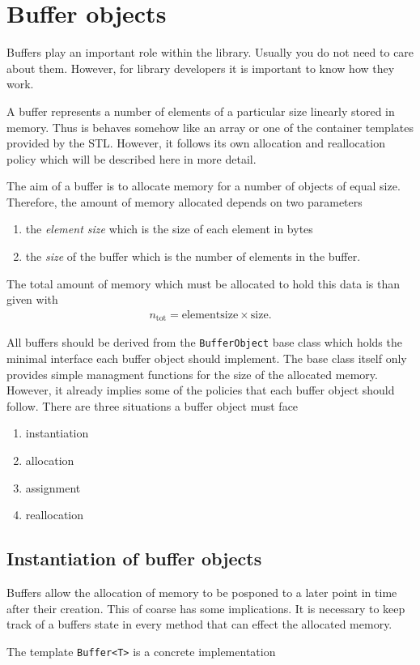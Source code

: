 \section{Buffer objects}
Buffers play an important role within the library. Usually you do not need 
to care about them. However, for library developers it is important 
to know how they work.

A buffer represents a number of elements of a particular size linearly 
stored in memory. Thus is behaves somehow like an array or one of the 
container templates provided by the STL. However, it follows its own 
allocation and reallocation policy which will be described here in more detail.  

The aim of a buffer is to allocate memory for a number of objects of equal 
size. Therefore, the amount of memory allocated depends on two parameters
\begin{enumerate}
  \item the {\em element size } which is the size of each element in bytes
  \item the {\em size } of the buffer which is the number of elements in the
  buffer.
\end{enumerate}
The total amount of memory which must be allocated to hold this data is 
than given with
\begin{align}
n_{\mathrm{tot}} = \mathrm{element size}\times\mathrm{size}.
\end{align}

All buffers should be derived from the {\tt BufferObject} base class which 
holds the minimal interface each buffer object should implement. 
The base class itself only provides simple managment functions for the
size of the allocated memory. However, it already implies some of the 
policies that each buffer object should follow. 
There are three situations a buffer object must face
\begin{enumerate}
  \item instantiation
  \item allocation
  \item assignment
  \item reallocation
\end{enumerate} 

\subsection{Instantiation of buffer objects}

Buffers allow the allocation of memory to be posponed to a later point in 
time after their creation. This of coarse has some implications. 
It is necessary to keep track of a buffers state in every method that 
can effect the allocated memory. 




The template {\tt Buffer<T>} is a concrete implementation 
